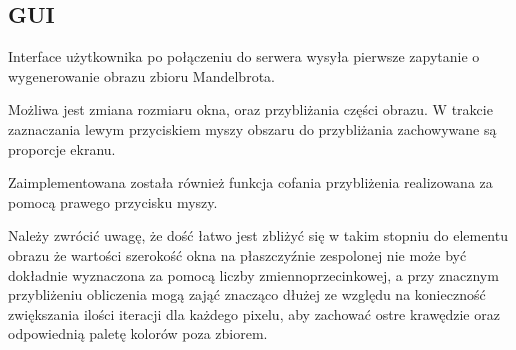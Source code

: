 \subsection{GUI}
Interface użytkownika po połączeniu do serwera wysyła pierwsze zapytanie o wygenerowanie obrazu zbioru Mandelbrota.

Możliwa jest zmiana rozmiaru okna, oraz przybliżania części obrazu.
W trakcie zaznaczania lewym przyciskiem myszy obszaru do przybliżania zachowywane są proporcje ekranu.

Zaimplementowana została również funkcja cofania przybliżenia realizowana za pomocą prawego przycisku myszy.

Należy zwrócić uwagę, że dość łatwo jest zbliżyć się w takim stopniu do elementu obrazu że wartości szerokość okna na płaszczyźnie zespolonej nie może być dokładnie wyznaczona za pomocą liczby zmiennoprzecinkowej, a przy znacznym przybliżeniu obliczenia mogą zająć znacząco dłużej ze względu na konieczność zwiększania ilości iteracji dla każdego pixelu, aby zachować ostre krawędzie oraz odpowiednią paletę kolorów poza zbiorem.


